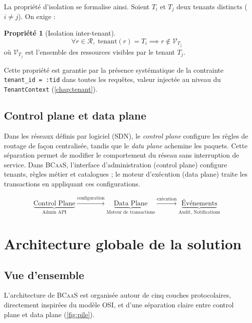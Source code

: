 \documentclass[12pt,a4paper]{report}
\theoremstyle{definition}
\newtheorem{propriete}{Propriété}[chapter]
\theoremstyle{remark}
\newcommand{\bcaas}{\textsc{BCaaS}}
\newcommand{\osi}{\textsc{OSI}}
\begin{document}
La propriété d'isolation se formalise ainsi. Soient $T_i$ et $T_j$ deux tenants distincts ($i \neq j$). On exige :

\begin{propriete}[Isolation inter-tenant]
	\[
	\forall r \in \mathcal{R},\; \text{tenant}(r) = T_i \implies r \notin \mathcal{V}_{T_j}
	\]
	où $\mathcal{V}_{T_j}$ est l'ensemble des ressources visibles par le tenant $T_j$.
\end{propriete}

Cette propriété est garantie par la présence systématique de la contrainte \texttt{tenant\_id = :tid} dans toutes les requêtes, valeur injectée au niveau du \texttt{TenantContext} (\cref{chap:tenant}).

\section{Control plane et data plane}

\begin{analogiebox}[Analogie : SDN $\leftrightarrow$ \bcaas{} Admin]
	Dans les réseaux définis par logiciel (SDN), le \textit{control plane} configure les règles de routage de façon centralisée, tandis que le \textit{data plane} achemine les paquets. Cette séparation permet de modifier le comportement du réseau sans interruption de service. Dans \bcaas, l'interface d'administration (control plane) configure tenants, règles métier et catalogues ; le moteur d'exécution (data plane) traite les transactions en appliquant ces configurations.
\end{analogiebox}

\[
\underbrace{\text{Control Plane}}_{\text{Admin API}} \xrightarrow{\text{configuration}} \underbrace{\text{Data Plane}}_{\text{Moteur de transactions}} \xrightarrow{\text{exécution}} \underbrace{\text{Événements}}_{\text{Audit, Notifications}}
\]

\chapter{Architecture globale de la solution}
\label{chap:architecture}

\section{Vue d'ensemble}

L'architecture de \bcaas{} est organisée autour de cinq couches protocolaires, directement inspirées du modèle \osi, et d'une séparation claire entre control plane et data plane (\cref{fig:pile}).
\end{document}
